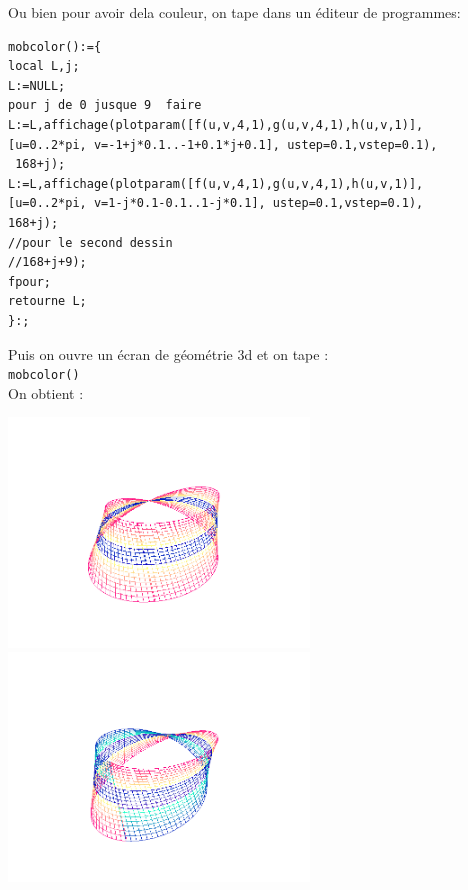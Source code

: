 \documentclass[a4paper,11pt]{book}
\begin{document}

Ou bien pour avoir dela couleur, on tape dans un \'editeur de programmes:
\begin{verbatim}
mobcolor():={
local L,j;
L:=NULL;
pour j de 0 jusque 9  faire 
L:=L,affichage(plotparam([f(u,v,4,1),g(u,v,4,1),h(u,v,1)],
[u=0..2*pi, v=-1+j*0.1..-1+0.1*j+0.1], ustep=0.1,vstep=0.1),
 168+j);
L:=L,affichage(plotparam([f(u,v,4,1),g(u,v,4,1),h(u,v,1)],
[u=0..2*pi, v=1-j*0.1-0.1..1-j*0.1], ustep=0.1,vstep=0.1),
168+j);
//pour le second dessin
//168+j+9);
fpour;
retourne L;
}:;
\end{verbatim}
Puis on ouvre un \'ecran de g\'eom\'etrie 3d et on tape :\\
{\tt mobcolor()}\\
On obtient :

\hspace*{-2cm} \includegraphics[width=8cm]{mobiusc}
\includegraphics[width=8cm]{mobiusc1}
\end{document}
